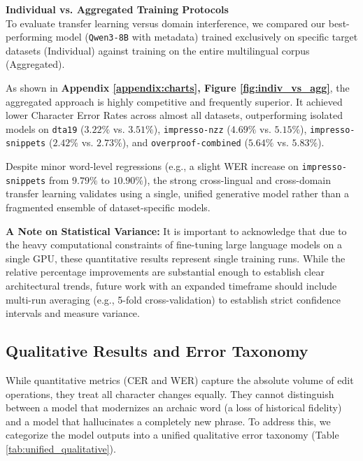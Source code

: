 \documentclass[11pt]{extarticle}
\begin{document}
\noindent\textbf{Individual vs. Aggregated Training Protocols}\\
To evaluate transfer learning versus domain interference, we compared our best-performing model (\texttt{Qwen3-8B} with metadata) trained exclusively on specific target datasets (Individual) against training on the entire multilingual corpus (Aggregated). 

As shown in \textbf{Appendix \ref{appendix:charts}, Figure \ref{fig:indiv_vs_agg}}, the aggregated approach is highly competitive and frequently superior. It achieved lower Character Error Rates across almost all datasets, outperforming isolated models on \texttt{dta19} ($3.22\%$ vs. $3.51\%$), \texttt{impresso-nzz} ($4.69\%$ vs. $5.15\%$), \texttt{impresso-snippets} ($2.42\%$ vs. $2.73\%$), and \texttt{overproof-combined} ($5.64\%$ vs. $5.83\%$). 


Despite minor word-level regressions (e.g., a slight WER increase on \texttt{impresso-snippets} from $9.79\%$ to $10.90\%$), the strong cross-lingual and cross-domain transfer learning validates using a single, unified generative model rather than a fragmented ensemble of dataset-specific models.

\noindent\textbf{A Note on Statistical Variance:} 
It is important to acknowledge that due to the heavy computational constraints of fine-tuning large language models on a single GPU, these quantitative results represent single training runs. While the relative percentage improvements are substantial enough to establish clear architectural trends, future work with an expanded timeframe should include multi-run averaging (e.g., 5-fold cross-validation) to establish strict confidence intervals and measure variance.


\subsection{Qualitative Results and Error Taxonomy}
While quantitative metrics (CER and WER) capture the absolute volume of edit operations, they treat all character changes equally. They cannot distinguish between a model that modernizes an archaic word (a loss of historical fidelity) and a model that hallucinates a completely new phrase. To address this, we categorize the model outputs into a unified qualitative error taxonomy (Table \ref{tab:unified_qualitative}).
\end{document}
